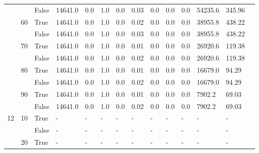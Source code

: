 \documentclass{article}
\begin{document}
\begin{landscape}
\begin{small}
\begin{longtable}[c]{@{}lll|ll|ll|ll|ll|lll@{}}
   &    & False & 14641.0         & 0.0            & 1.0           & 0.0           & 0.03          & 0.0           & 0.0           & 0.0           & 54235.6       & 345.96      &  \\
   & 60 & True  & 14641.0         & 0.0            & 1.0           & 0.0           & 0.02          & 0.0           & 0.0           & 0.0           & 38955.8       & 438.22      &  \\
   &    & False & 14641.0         & 0.0            & 1.0           & 0.0           & 0.03          & 0.0           & 0.0           & 0.0           & 38955.8       & 438.22      &  \\
   & 70 & True  & 14641.0         & 0.0            & 1.0           & 0.0           & 0.01          & 0.0           & 0.0           & 0.0           & 26920.6       & 119.38      &  \\
   &    & False & 14641.0         & 0.0            & 1.0           & 0.0           & 0.02          & 0.0           & 0.0           & 0.0           & 26920.6       & 119.38      &  \\
   & 80 & True  & 14641.0         & 0.0            & 1.0           & 0.0           & 0.01          & 0.0           & 0.0           & 0.0           & 16679.0       & 94.29       &  \\
   &    & False & 14641.0         & 0.0            & 1.0           & 0.0           & 0.02          & 0.0           & 0.0           & 0.0           & 16679.0       & 94.29       &  \\
   & 90 & True  & 14641.0         & 0.0            & 1.0           & 0.0           & 0.01          & 0.0           & 0.0           & 0.0           & 7902.2        & 69.03       &  \\
   &    & False & 14641.0         & 0.0            & 1.0           & 0.0           & 0.02          & 0.0           & 0.0           & 0.0           & 7902.2        & 69.03       &  \\
  \midrule
12 & 10 & True  & -               & -              & -             & -             & -             & -             & -             & -             & -             & -           &  \\
   &    & False & -               & -              & -             & -             & -             & -             & -             & -             & -             & -           &  \\
   & 20 & True  & -               & -              & -             & -             & -             & -             & -             & -             & -             & -           &  \\

\end{longtable}
\end{small}
\end{landscape}
\end{document}
